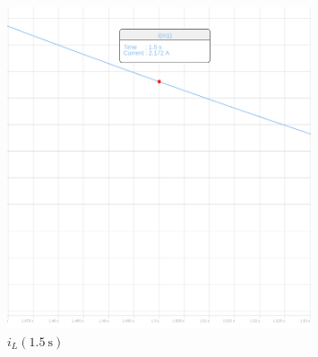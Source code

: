 \begin{figure}[h!]
    \centering
    \includegraphics[width=0.8\textwidth]{img/graf.png}
    \caption{$i_L(\SI{1.5}{\second})$}
\end{figure}







